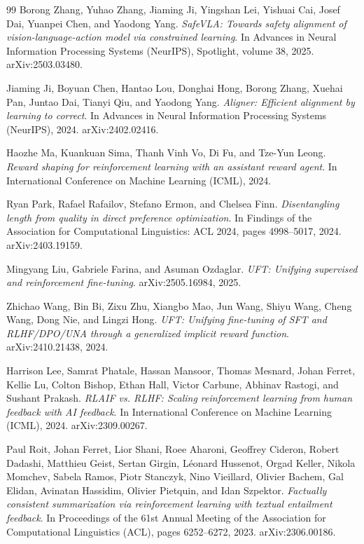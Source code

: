 \begin{thebibliography}{99}
Borong Zhang, Yuhao Zhang, Jiaming Ji, Yingshan Lei, Yishuai Cai, Josef Dai, Yuanpei Chen, and Yaodong Yang.
\textit{SafeVLA: Towards safety alignment of vision-language-action model via constrained learning}.
In Advances in Neural Information Processing Systems (NeurIPS), Spotlight, volume 38, 2025.
arXiv:2503.03480.

Jiaming Ji, Boyuan Chen, Hantao Lou, Donghai Hong, Borong Zhang, Xuehai Pan, Juntao Dai, Tianyi Qiu, and Yaodong Yang.
\textit{Aligner: Efficient alignment by learning to correct}.
In Advances in Neural Information Processing Systems (NeurIPS), 2024.
arXiv:2402.02416.

Haozhe Ma, Kuankuan Sima, Thanh Vinh Vo, Di Fu, and Tze-Yun Leong.
\textit{Reward shaping for reinforcement learning with an assistant reward agent}.
In International Conference on Machine Learning (ICML), 2024.

Ryan Park, Rafael Rafailov, Stefano Ermon, and Chelsea Finn.
\textit{Disentangling length from quality in direct preference optimization}.
In Findings of the Association for Computational Linguistics: ACL 2024, pages 4998--5017, 2024.
arXiv:2403.19159.

Mingyang Liu, Gabriele Farina, and Asuman Ozdaglar.
\textit{UFT: Unifying supervised and reinforcement fine-tuning}.
arXiv:2505.16984, 2025.

Zhichao Wang, Bin Bi, Zixu Zhu, Xiangbo Mao, Jun Wang, Shiyu Wang, Cheng Wang, Dong Nie, and Lingzi Hong.
\textit{UFT: Unifying fine-tuning of SFT and RLHF/DPO/UNA through a generalized implicit reward function}.
arXiv:2410.21438, 2024.

Harrison Lee, Samrat Phatale, Hassan Mansoor, Thomas Mesnard, Johan Ferret, Kellie Lu, Colton Bishop, Ethan Hall, Victor Carbune, Abhinav Rastogi, and Sushant Prakash.
\textit{RLAIF vs. RLHF: Scaling reinforcement learning from human feedback with AI feedback}.
In International Conference on Machine Learning (ICML), 2024.
arXiv:2309.00267.

Paul Roit, Johan Ferret, Lior Shani, Roee Aharoni, Geoffrey Cideron, Robert Dadashi, Matthieu Geist, Sertan Girgin, L\'eonard Hussenot, Orgad Keller, Nikola Momchev, Sabela Ramos, Piotr Stanczyk, Nino Vieillard, Olivier Bachem, Gal Elidan, Avinatan Hassidim, Olivier Pietquin, and Idan Szpektor.
\textit{Factually consistent summarization via reinforcement learning with textual entailment feedback}.
In Proceedings of the 61st Annual Meeting of the Association for Computational Linguistics (ACL), pages 6252--6272, 2023.
arXiv:2306.00186.


\end{thebibliography}
